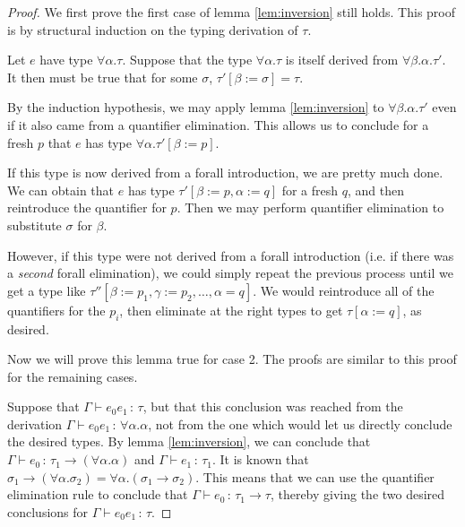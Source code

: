 \documentclass{article}
\newcommand{\hastp}[3]{#1 \vdash #2 \,:\, #3}
\begin{document}
\begin{proof}

  We first prove the first case of lemma \ref{lem:inversion} still holds. This
  proof is by structural induction on the typing derivation of \(\tau\).

  Let \(e\) have type \(\forall \alpha. \tau\). Suppose that the type \(\forall
  \alpha. \tau\) is itself derived from \(\forall \beta. \alpha. \tau'\). It
  then must be true that for some \(\sigma\), \(\tau'[\beta := \sigma] = \tau\).

  By the induction hypothesis, we may apply lemma \ref{lem:inversion} to
  \(\forall \beta. \alpha. \tau'\) even if it also came from a quantifier
  elimination. This allows us to conclude for a fresh \(p\) that \(e\) has type
  \(\forall \alpha. \tau'[\beta := p]\).

  If this type is now derived from a forall introduction, we are pretty much
  done. We can obtain that \(e\) has type \(\tau'[\beta := p, \alpha := q]\) for
  a fresh \(q\), and then reintroduce the quantifier for \(p\). Then we may
  perform quantifier elimination to substitute \(\sigma\) for \(\beta\).

  However, if this type were not derived from a forall introduction (i.e. if
  there was a \emph{second} forall elimination), we could simply repeat the
  previous process until we get a type like \(\tau''[\beta := p_1, \gamma :=
  p_2, \dots, \alpha = q ]\). We would reintroduce all of the quantifiers for
  the \(p_i\), then eliminate at the right types to get \(\tau[\alpha := q]\),
  as desired.

  Now we will prove this lemma true for case 2. The proofs are similar to this
  proof for the remaining cases.
  
  Suppose that \(\hastp \Gamma {e_0 e_1} \tau\), but that this conclusion was
  reached from the derivation \(\hastp \Gamma {e_0 e_1} {\forall \alpha.
    \alpha}\), not from the one which would let us directly conclude the desired
  types. By lemma \ref{lem:inversion}, we can conclude that \(\hastp \Gamma
  {e_0} {\tau_1 \to (\forall \alpha. \alpha)}\) and \(\hastp \Gamma {e_1}
  {\tau_1}\). It is known that \(\sigma_1 \to (\forall \alpha. \sigma_2) =
  \forall \alpha. (\sigma_1 \to \sigma_2)\). This means that we can use the
  quantifier elimination rule to conclude that \(\hastp \Gamma {e_0} {\tau_1 \to
    \tau}\), thereby giving the two desired conclusions for \(\hastp \Gamma {e_0
    e_1} \tau\).
  
\end{proof}
\end{document}

